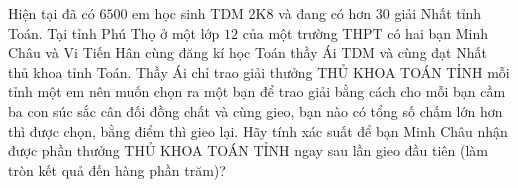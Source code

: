 \begin{ex}%
	Hiện tại đã có $6500$ em học sinh TDM 2K8 và đang có hơn $30$ giải Nhất tỉnh Toán. Tại tỉnh Phú Thọ ở một lớp $12$ của một trường THPT có hai bạn Minh Châu và Vi Tiến Hân cùng đăng kí học Toán thầy Ái TDM và cùng đạt Nhất thủ khoa tỉnh Toán. Thầy Ái chỉ trao giải thưởng THỦ KHOA TOÁN TỈNH mỗi tỉnh một em nên muốn chọn ra một bạn để trao giải bằng cách cho mỗi bạn cầm ba con súc sắc cân đối đồng chất và cùng gieo, bạn nào có tổng số chấm lớn hơn thì được chọn, bằng điểm thì gieo lại. Hãy tính xác suất để bạn Minh Châu nhận được phần thưởng THỦ KHOA TOÁN TỈNH ngay sau lần gieo đầu tiên (làm tròn kết quả đến hàng phần trăm)?
	\par{}
\end{ex}
